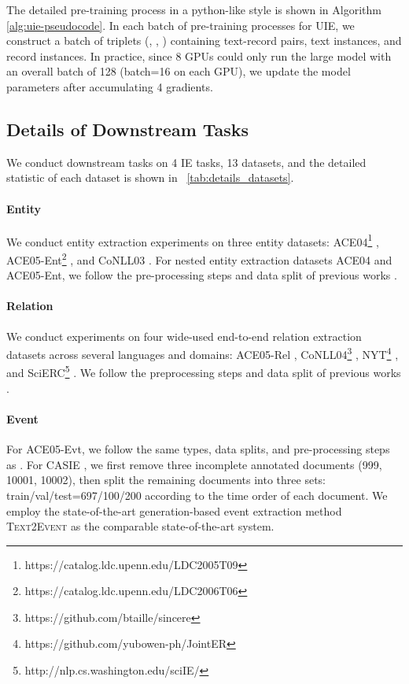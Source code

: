 \documentclass[11pt]{article}
\begin{document}
The detailed pre-training process in a python-like style is shown in Algorithm \ref{alg:uie-pseudocode}.
In each batch of pre-training processes for UIE, we construct a batch of triplets (, , ) containing text-record pairs, text instances, and record instances.
In practice, since 8 GPUs could only run the large model with an overall batch of 128 (batch=16 on each GPU), we update the model parameters after accumulating 4 gradients.

\subsection{Details of Downstream Tasks} \label{sec:downstream_tasks}

We conduct downstream tasks on 4 IE tasks, 13 datasets, and the detailed statistic of each dataset is shown in \tablename~\ref{tab:details_datasets}.

\paragraph{Entity}
We conduct entity extraction experiments on three entity datasets: 
ACE04\footnote{https://catalog.ldc.upenn.edu/LDC2005T09} \citep{ace2004-annotation}, ACE05-Ent\footnote{https://catalog.ldc.upenn.edu/LDC2006T06} \citep{ace2005-annotation}, 
and CoNLL03 \citep{tjongkimsang2003conll}.
For nested entity extraction datasets ACE04 and ACE05-Ent, we follow the pre-processing steps and data split of previous works \cite{li-etal-2020-unified}.

\paragraph{Relation}
We conduct experiments on four wide-used end-to-end relation extraction datasets across several languages and domains: ACE05-Rel \citep{ace2005-annotation}, CoNLL04\footnote{https://github.com/btaille/sincere} \citep{roth-yih-2004-linear}, NYT\footnote{https://github.com/yubowen-ph/JointER} \citep{10.1007/978-3-642-15939-8_10}, and SciERC\footnote{http://nlp.cs.washington.edu/sciIE/} \citep{luan-etal-2018-multi}.
We follow the preprocessing steps and data split of previous works \citep{taille-etal-2020-lets,yu2020jointer,wadden-etal-2019-entity}.

\paragraph{Event}
For ACE05-Evt, we follow the same types, data splits, and pre-processing steps as \citet{lin-etal-2020-joint}.
For CASIE \citep{Satyapanich_Ferraro_Finin_2020}, we first remove three incomplete annotated documents (999, 10001, 10002), then split the remaining documents into three sets: train/val/test=697/100/200 according to the time order of each document.
We employ the state-of-the-art generation-based event extraction method \textsc{Text2Event} \citep{lu-etal-2021-text2event} as the comparable state-of-the-art system.
\end{document}
